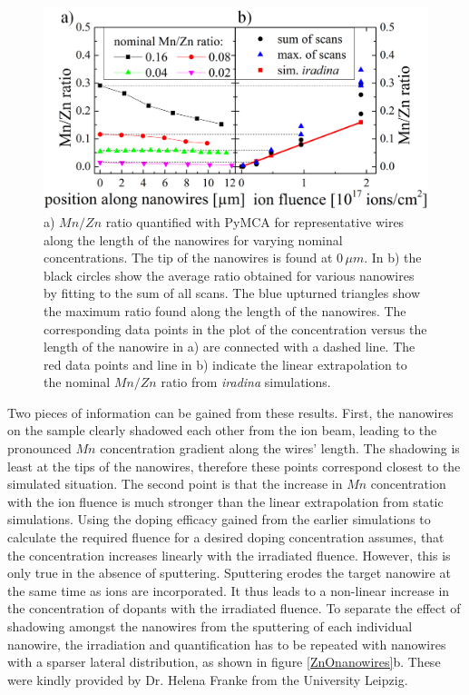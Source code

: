 \begin{figure}
	\centering
		\includegraphics[width=.8\textwidth]{images/MnZn1.png}
	\caption{a) $Mn/Zn$ ratio quantified with PyMCA for representative wires along the length of the nanowires for varying nominal concentrations. The tip of the nanowires is found at $0\,\mu m$. In b) the black circles show the average ratio obtained for various nanowires by fitting to the sum of all scans. The blue upturned triangles show the maximum ratio found along the length of the nanowires. The corresponding data points in the plot of the concentration versus the length of the nanowire in a) are connected with a dashed line. The red data points and line in b) indicate the linear extrapolation to the nominal $Mn/Zn$ ratio from \emph{iradina} simulations.}
	\label{MnZn1}
\end{figure} 
 
Two pieces of information can be gained from these results. First, the nanowires on the sample clearly shadowed each other from the ion beam, leading to the pronounced $Mn$ concentration gradient along the wires' length. The shadowing is least at the tips of the nanowires, therefore these points correspond closest to the simulated situation. The second point is that the increase in $Mn$ concentration with the ion fluence is much stronger than the linear extrapolation from static simulations. Using the doping efficacy gained from the earlier simulations to calculate the required fluence for a desired doping concentration assumes, that the concentration increases linearly with the irradiated fluence. However, this is only true in the absence of sputtering. Sputtering erodes the target nanowire at the same time as ions are incorporated. It thus leads to a non-linear increase in the concentration of dopants with the irradiated fluence. To separate the effect of shadowing amongst the nanowires from the sputtering of each individual nanowire, the irradiation and quantification has to be repeated with nanowires with a sparser lateral distribution, as shown in figure \ref{ZnOnanowires}b. These were kindly provided by Dr. Helena Franke from the University Leipzig.


